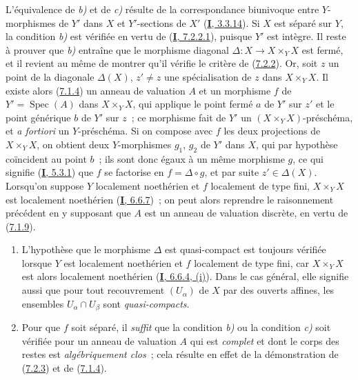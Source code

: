 L'équivalence de \emph{b)} et de \emph{c)} résulte de la correspondance biunivoque entre
$Y$-morphismes de $Y'$ dans $X$ et $Y'$-sections de $X'$
(\hyperref[I.3.3.14-fr]{\textbf{I}, 3.3.14}). Si $X$ est séparé sur $Y$, la condition \emph{b)}
est vérifiée en vertu de (\hyperref[I.7.2.2.1-fr]{\textbf{I}, 7.2.2.1}), puisque $Y'$
est intègre. Il reste à prouver que \emph{b)} entraîne que le morphisme diagonal
$\Delta:X\to X\times_YX$ est fermé, et il revient au même de montrer qu'il
vérifie le critère de (\hyperref[II.7.2.2-fr]{7.2.2}). Or, soit $z$ un point de
la diagonale $\Delta(X)$, $z'\neq z$ une spécialisation de $z$ dans
$X\times_YX$. Il existe alors (\hyperref[II.7.1.4-fr]{7.1.4}) un anneau de
valuation $A$ et un morphisme $f$ de $Y'=\operatorname{Spec}(A)$ dans
$X\times_YX$, qui applique le point fermé $a$ de $Y'$ sur $z'$ et le point
générique $b$ de $Y'$ sur $z$~; ce morphisme fait de $Y'$ un
$(X\times_YX)$-préschéma, et \emph{a fortiori} un $Y$-préschéma. Si on compose
avec $f$ les deux projections de $X\times_YX$, on obtient deux $Y$-morphismes
$g_1$, $g_2$ de $Y'$ dans $X$, qui par hypothèse coïncident au point $b$~; ils
sont donc égaux à un même morphisme $g$, ce qui signifie
(\hyperref[I.5.3.1-fr]{\textbf{I}, 5.3.1}) que $f$ se factorise en $f=\Delta\circ g$, et
par suite $z'\in\Delta(X)$. Lorsqu'on suppose $Y$ localement noethérien et $f$
localement de type fini, $X\times_YX$ est localement noethérien
(\hyperref[I.6.6.7-fr]{\textbf{I}, 6.6.7})~; on peut alors reprendre le raisonnement
précédent en y supposant que $A$ est un anneau de valuation discrète, en vertu
de (\hyperref[II.7.1.9-fr]{7.1.9}).

\begin{remark}[7.2.4]
\label{II.7.2.4-fr}
\begin{enumerate}
\item[\rm (i)] L'hypothèse que le morphisme $\Delta$ est quasi-compact est
toujours vérifiée lorsque $Y$ est localement noethérien et $f$ localement de
type fini, car $X\times_YX$ est alors localement noethérien
(\hyperref[I.6.6.4-fr]{\textbf{I}, 6.6.4, (i)}). Dans le cas général, elle signifie aussi
que pour tout recouvrement $(U_\alpha)$ de $X$ par des ouverts affines, les
ensembles $U_\alpha\cap U_\beta$ sont \emph{quasi-compacts}.
\item[\rm (ii)] Pour que $f$ soit séparé, il \emph{suffit} que la condition \emph{b)}
ou la condition \emph{c)} soit vérifiée pour un anneau de valuation $A$ qui est
\emph{complet} et dont le corps des restes est \emph{algébriquement clos}~;
cela résulte en effet de la démonstration de
(\hyperref[II.7.2.3-fr]{7.2.3}) et de
(\hyperref[II.7.1.4-fr]{7.1.4}).
\end{enumerate}
\end{remark}

